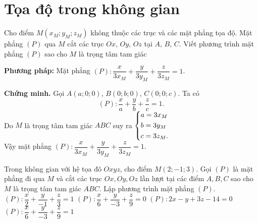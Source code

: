 \newpage

\chapter{Tọa độ trong không gian}


\begin{dang}{}
	{Cho điểm $ M(x_M;y_M;z_M) $ không thuộc các trục và các mặt phẳng tọa độ. Mặt phẳng $ (P) $ qua $ M $ cắt các trục $ Ox $, $ Oy $, $ Oz $ tại $ A $, $ B $, $ C $. Viết phương trình mặt phẳng $ (P) $ sao cho $ M $ là trọng tâm tam giác}
	
	\textbf{Phương pháp:} Mặt phẳng $ (P)\colon \dfrac{x}{3x_M}+\dfrac{y}{3y_M}+\dfrac{z}{3z_M}=1$.
	
	\textbf{Chứng minh.} Gọi $ A(a;0;0) $, $ B(0;b;0) $, $ C(0;0;c) $. Ta có 
	\[(P)\colon\dfrac{x}{a}+\dfrac{y}{b}+\dfrac{z}{c}=1.\]
	Do $ M $ là trọng tâm tam giác $ ABC $ suy ra $ \left\{\begin{aligned}& a=3x_M\\& b=3y_M\\& c=3z_M.\end{aligned}\right. $\\
	Vậy mặt phẳng $ (P)\colon \dfrac{x}{3x_M}+\dfrac{y}{3y_M}+\dfrac{z}{3z_M}=1$.
\end{dang}


\begin{vd}
	Trong không gian với hệ tọa đô $Oxyz$, cho điểm $M(2;-1;3)$. Gọi $(P)$ là mặt phẳng đi qua $M$ và cắt các trục $Ox,Oy,Oz$ lần lượt tại các điểm $A,B,C$ sao cho  $ M $ là trọng tâm tam giác $ ABC $. Lập phương trình mặt phẳng $(P)$.
	\choice
	{$(P)\colon \dfrac{x}{2}+\dfrac{y}{-1}+\dfrac{z}{3}=1$}
	{$(P)\colon \dfrac{x}{6}+\dfrac{y}{-3}+\dfrac{z}{9}=0$}
	{$(P)\colon 2x-y+3z-14=0$}
	{\True $(P)\colon \dfrac{x}{6}+\dfrac{y}{-3}+\dfrac{z}{9}=1$}
\end{vd}

